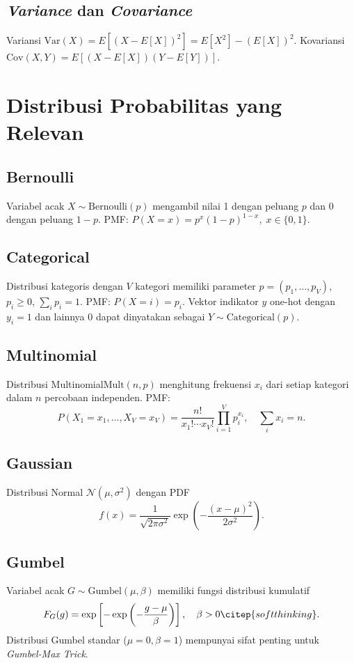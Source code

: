 \subsection{\textit{Variance} dan \textit{Covariance}}
Variansi \( \text{Var}(X) = E[(X - E[X])^2] = E[X^2] - (E[X])^2\).
Kovariansi \( \text{Cov}(X,Y) = E[(X - E[X])(Y - E[Y])]\).

\section{Distribusi Probabilitas yang Relevan}

\subsection{Bernoulli}
Variabel acak \(X \sim \text{Bernoulli}(p)\) mengambil nilai 1 dengan peluang \(p\) dan 0 dengan peluang \(1-p\). PMF: \(P(X=x) = p^x (1-p)^{1-x}, \; x \in \{0,1\}\).

\subsection{Categorical}
Distribusi kategoris dengan \(V\) kategori memiliki parameter \(p = (p_1,\dots,p_V)\), \(p_i \ge 0\), \(\sum_i p_i = 1\). PMF: \(P(X = i) = p_i\). Vektor indikator \(y\) one-hot dengan \(y_i = 1\) dan lainnya 0 dapat dinyatakan sebagai \(Y \sim \text{Categorical}(p)\).

\subsection{Multinomial}
Distribusi Multinomial\(\text{Mult}(n, p)\) menghitung frekuensi \(x_i\) dari setiap kategori dalam \(n\) percobaan independen. PMF:
\begin{equation}
P(X_1=x_1,\dots,X_V=x_V) = \frac{n!}{x_1!\cdots x_V!} \prod_{i=1}^V p_i^{x_i}, \quad \sum_i x_i = n.
\end{equation}

\subsection{Gaussian}
Distribusi Normal \(\mathcal{N}(\mu, \sigma^2)\) dengan PDF
\begin{equation}
f(x) = \frac{1}{\sqrt{2\pi\sigma^2}} \exp\left(-\frac{(x-\mu)^2}{2\sigma^2}\right).
\end{equation}

\subsection{Gumbel}
Variabel acak \(G \sim \text{Gumbel}(\mu, \beta)\) memiliki fungsi distribusi kumulatif
\begin{equation}
F_G(g) = \exp\left[-\exp\left(-\frac{g-\mu}{\beta}\right)\right], \quad \beta>0 \citep{softthinking}.
\end{equation}
Distribusi Gumbel standar (\(\mu=0,\beta=1\)) mempunyai sifat penting untuk \textit{Gumbel-Max Trick}.

